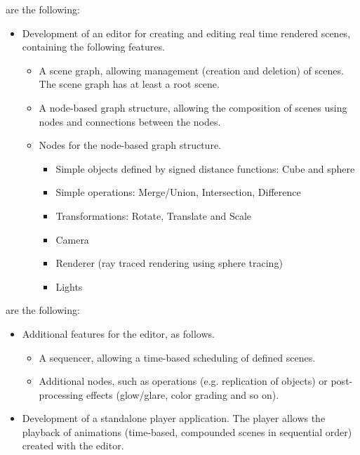 \documentclass[%
    a4paper,
    nobib,   %
    openany  %
]{tufte-book}
\begin{document}
 are the following:
\begin{itemize}
  \item Development of an editor for creating and editing real time rendered
    scenes, containing the following features.
    \begin{itemize}
      \item A scene graph, allowing management (creation and deletion) of
        scenes. The scene graph has at least a root scene.
    \item A node-based graph structure, allowing the composition of scenes using
      nodes and connections between the nodes.
    \item Nodes for the node-based graph structure.
      \begin{itemize}
        
        \item Simple objects defined by signed distance functions: Cube and
          sphere
        \item Simple operations: Merge/Union, Intersection, Difference
        \item Transformations: Rotate, Translate and Scale
        \item Camera
        \item Renderer (ray traced rendering using sphere tracing)
        \item Lights
      \end{itemize}
    \end{itemize}
\end{itemize}

 are the following:
\begin{itemize}
  \item Additional features for the editor, as follows.
  \begin{itemize}
    \item A sequencer, allowing a time-based scheduling of defined scenes.
    \item Additional nodes, such as operations (e.g. replication of objects)
      or post-processing effects (glow/glare, color grading and so on).
  \end{itemize}
  \item Development of a standalone player application. The player allows the
    playback of animations (time-based, compounded scenes in sequential order)
    created with the editor.
\end{itemize}
\end{document}
